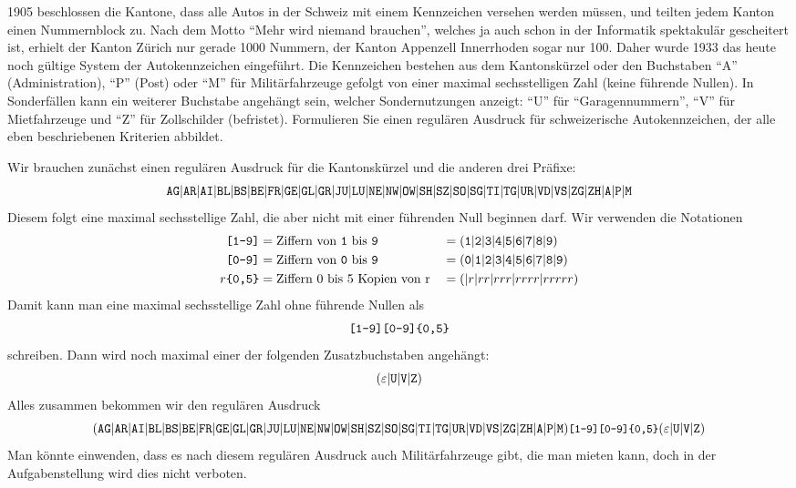 1905 beschlossen die Kantone, dass alle Autos in der Schweiz mit einem
Kennzeichen versehen werden müssen, und teilten jedem Kanton einen
Nummernblock zu. Nach dem Motto ``Mehr wird niemand brauchen'', welches
ja auch schon in der Informatik spektakulär gescheitert ist, erhielt
der Kanton Zürich nur gerade 1000 Nummern, der
Kanton Appenzell Innerrhoden sogar nur 100.
Daher wurde 1933 das heute noch gültige System der Autokennzeichen
eingeführt. Die Kennzeichen bestehen aus dem Kantonskürzel
oder den Buchstaben ``A'' (Administration), ``P'' (Post) oder
``M'' für Militärfahrzeuge gefolgt von einer maximal sechsstelligen Zahl
(keine führende Nullen).
In Sonderfällen kann ein weiterer Buchstabe angehängt sein, welcher
Sondernutzungen anzeigt: ``U'' für ``Garagennummern'',
``V'' für Mietfahrzeuge und ``Z'' für Zollschilder (befristet).
Formulieren Sie einen regulären Ausdruck für schweizerische Autokennzeichen,
der alle eben beschriebenen Kriterien abbildet.


\begin{loesung}
Wir brauchen zunächst einen regulären Ausdruck für die Kantonskürzel
und die anderen drei Präfixe:
\[
{\tt AG}|
{\tt AR}|
{\tt AI}|
{\tt BL}|
{\tt BS}|
{\tt BE}|
{\tt FR}|
{\tt GE}|
{\tt GL}|
{\tt GR}|
{\tt JU}|
{\tt LU}|
{\tt NE}|
{\tt NW}|
{\tt OW}|
{\tt SH}|
{\tt SZ}|
{\tt SO}|
{\tt SG}|
{\tt TI}|
{\tt TG}|
{\tt UR}|
{\tt VD}|
{\tt VS}|
{\tt ZG}|
{\tt ZH}|
{\tt A}|
{\tt P}|
{\tt M}
\]
Diesem folgt eine maximal sechsstellige Zahl, die aber nicht mit einer
führenden Null beginnen darf. Wir verwenden die Notationen
\begin{align*}
\text{\tt [1-9]}&=\text{Ziffern von {\tt 1} bis {\tt 9}}
&&=
({\tt 1}|
{\tt 2}|
{\tt 3}|
{\tt 4}|
{\tt 5}|
{\tt 6}|
{\tt 7}|
{\tt 8}|
{\tt 9})
\\
\text{\tt [0-9]}&=\text{Ziffern von {\tt 0} bis {\tt 9}}
&&=
({\tt 0}|
{\tt 1}|
{\tt 2}|
{\tt 3}|
{\tt 4}|
{\tt 5}|
{\tt 6}|
{\tt 7}|
{\tt 8}|
{\tt 9})
\\
r{\text{\tt \{0,5\}}}&=\text{Ziffern 0 bis 5 Kopien von r}
&&=(|r|rr|rrr|rrrr|rrrrr)
\end{align*}
Damit kann man eine maximal sechsstellige Zahl ohne führende Nullen als
\[
\text{\tt [1-9][0-9]\{0,5\}}
\]
schreiben.
Dann wird noch maximal einer der folgenden Zusatzbuchstaben angehängt:
\[
(\varepsilon|{\tt U}|{\tt V}|{\tt Z})
\]
Alles zusammen bekommen wir den regulären Ausdruck
\[
\small
(
{\tt AG}|
{\tt AR}|
{\tt AI}|
{\tt BL}|
{\tt BS}|
{\tt BE}|
{\tt FR}|
{\tt GE}|
{\tt GL}|
{\tt GR}|
{\tt JU}|
{\tt LU}|
{\tt NE}|
{\tt NW}|
{\tt OW}|
{\tt SH}|
{\tt SZ}|
{\tt SO}|
{\tt SG}|
{\tt TI}|
{\tt TG}|
{\tt UR}|
{\tt VD}|
{\tt VS}|
{\tt ZG}|
{\tt ZH}|
{\tt A}|
{\tt P}|
{\tt M})
\text{\tt [1-9][0-9]\{0,5\}}
(\varepsilon|{\tt U}|{\tt V}|{\tt Z})
\]
Man könnte einwenden, dass es nach diesem regulären Ausdruck auch
Militärfahrzeuge gibt, die man mieten kann, doch in der Aufgabenstellung
wird dies nicht verboten.
\end{loesung}

